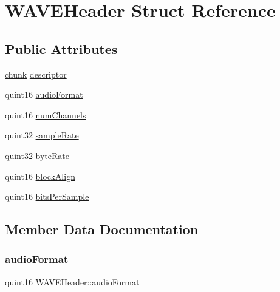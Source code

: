 \hypertarget{struct_w_a_v_e_header}{}\section{W\+A\+V\+E\+Header Struct Reference}
\label{struct_w_a_v_e_header}
\subsection*{Public Attributes}
\begin{DoxyCompactItemize}
\item 
\hyperlink{structchunk}{chunk} \hyperlink{struct_w_a_v_e_header_a763f44cebee2065d899d5997e9b22e60}{descriptor}
\item 
quint16 \hyperlink{struct_w_a_v_e_header_adaa2b3225220ab7448035e656c6669d9}{audio\+Format}
\item 
quint16 \hyperlink{struct_w_a_v_e_header_a547399f45cc973c818b62fe5410cdd04}{num\+Channels}
\item 
quint32 \hyperlink{struct_w_a_v_e_header_aa4f1b67d3e8e2d455f4f5fbc61c82c2d}{sample\+Rate}
\item 
quint32 \hyperlink{struct_w_a_v_e_header_aa0db8c5f2933a00865fabab8d1faa014}{byte\+Rate}
\item 
quint16 \hyperlink{struct_w_a_v_e_header_a9c53314461e82fa197f69dd44ba1eacc}{block\+Align}
\item 
quint16 \hyperlink{struct_w_a_v_e_header_a0847636e0f72678c584b1506e569e19d}{bits\+Per\+Sample}
\end{DoxyCompactItemize}


\subsection{Member Data Documentation}
\hypertarget{struct_w_a_v_e_header_adaa2b3225220ab7448035e656c6669d9}{}\label{struct_w_a_v_e_header_adaa2b3225220ab7448035e656c6669d9} 
\subsubsection{\texorpdfstring{audio\+Format}{audioFormat}}
{\footnotesize\ttfamily quint16 W\+A\+V\+E\+Header\+::audio\+Format}

\hypertarget{struct_w_a_v_e_header_a0847636e0f72678c584b1506e569e19d}{}\label{struct_w_a_v_e_header_a0847636e0f72678c584b1506e569e19d} 
